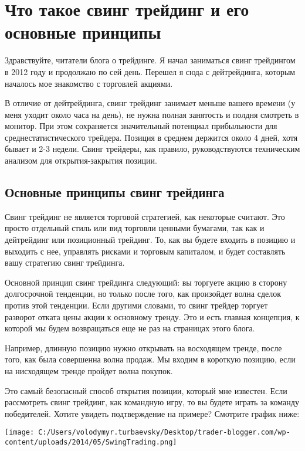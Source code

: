 \documentclass[a5paper]{article}
\begin{document}
\section{Что такое свинг трейдинг и его основные принципы}

Здравствуйте, читатели блога о трейдинге. Я начал заниматься свинг трейдингом в 2012 году и продолжаю по сей день. Перешел я сюда с дейтрейдинга, которым началось мое знакомство с торговлей акциями.

В отличие от дейтрейдинга, свинг трейдинг занимает меньше вашего времени (у меня уходит около часа на день), не нужна полная занятость и полдня смотреть в монитор. При этом сохраняется значительный потенциал прибыльности для среднестатистического трейдера. Позиция в среднем держится около 4 дней, хотя бывает и 2-3 недели. Свинг трейдеры, как правило, руководствуются техническим анализом для открытия-закрытия позиции.

\subsection{Основные принципы свинг трейдинга}

Свинг трейдинг не является торговой стратегией, как некоторые считают. Это просто отдельный стиль или вид торговли ценными бумагами, так как и дейтрейдинг или позиционный трейдинг. То, как вы будете входить в позицию и выходить с нее, управлять рисками и торговым капиталом, и будет составлять вашу стратегию свинг трейдинга.

Основной принцип свинг трейдинга следующий: вы торгуете акцию в сторону долгосрочной тенденции, но только после того, как произойдет волна сделок против этой тенденции. Если другими словами, то свинг трейдер торгует разворот отката цены акции к основному тренду. Это и есть главная концепция, к которой мы будем возвращаться еще не раз на страницах этого блога.

Например, длинную позицию нужно открывать на восходящем тренде, после того, как была совершенна волна продаж. Мы входим в короткую позицию, если на нисходящем тренде пройдет волна покупок.

Это самый безопасный способ открытия позиции, который мне известен. Если рассмотреть свинг трейдинг, как командную игру, то вы будете играть за команду победителей. Хотите увидеть подтверждение на примере? Смотрите график ниже:

\texttt{[image: C:/Users/volodymyr.turbaevsky/Desktop/trader-blogger.com/wp-content/uploads/2014/05/SwingTrading.png]}
\end{document}
